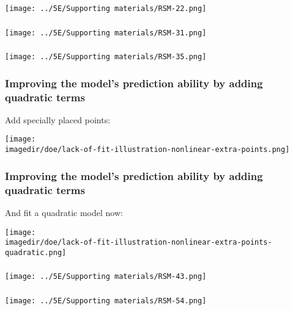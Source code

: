 \documentclass[handout,11pt,aspectratio=169,mathserif]{beamer}
\begin{document}
\begin{frame}\frametitle{}
	\centerline{\texttt{[image: ../5E/Supporting materials/RSM-22.png]}}
\end{frame}
\begin{frame}\frametitle{}
	\centerline{\texttt{[image: ../5E/Supporting materials/RSM-31.png]}}
\end{frame}
\begin{frame}\frametitle{}
	\centerline{\texttt{[image: ../5E/Supporting materials/RSM-35.png]}}
\end{frame}
\begin{frame}\frametitle{Improving the model's prediction ability by adding quadratic terms}
	Add specially placed points:
	
	\centerline{\texttt{[image: \\imagedir/doe/lack-of-fit-illustration-nonlinear-extra-points.png]}}
\end{frame}
\begin{frame}\frametitle{Improving the model's prediction ability by adding quadratic terms}
	And fit a quadratic model now:
	
	\centerline{\texttt{[image: \\imagedir/doe/lack-of-fit-illustration-nonlinear-extra-points-quadratic.png]}}
\end{frame}
\begin{frame}\frametitle{}
	\centerline{\texttt{[image: ../5E/Supporting materials/RSM-43.png]}}
\end{frame}
\begin{frame}\frametitle{}
	\centerline{\texttt{[image: ../5E/Supporting materials/RSM-54.png]}}
\end{frame}
\end{document}
